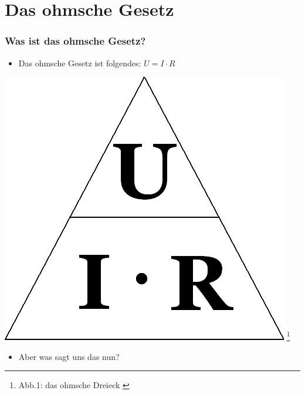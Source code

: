 


\subtitle{Technik Klasse E 03 \\
          Ohmsches Gesetz, Leistung \& Arbeit \\[2em]}
\date{Stand 27.10.2015}



\section{Das ohmsche Gesetz}

\begin{frame}
    \frametitle{Was ist das ohmsche Gesetz?}
    \begin{itemize}
    	\item Das ohmsche Gesetz ist folgendes: $U = I \cdot R$
    \end{itemize}
    \begin{center}
 		\includegraphics[scale=0.3]{e03/Ohm_law_triangle.png}
 		\footnote{Abb.1: das ohmsche Dreieck \cite{wmen}}
 	\end{center}
 	\begin{itemize}
 		\item	Aber was sagt uns das nun?
 	\end{itemize}
\end{frame}

